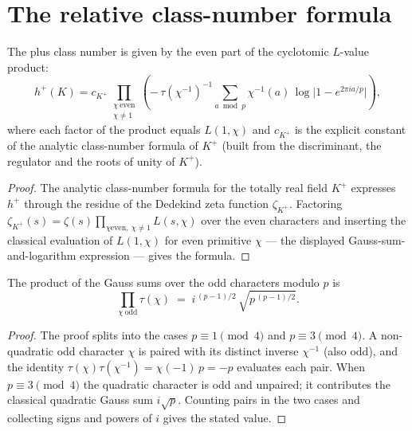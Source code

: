 \section{The relative class-number formula}

\begin{theorem}\label{thm:hplus-even-lvalues}
  \leanok
The plus class number is given by the even part of the cyclotomic
$L$-value product:
\[
  h^+(K)=
  c_{K^+}
  \prod_{\substack{\chi\ \mathrm{even}\\ \chi\ne1}}
  \left(
    -\,\tau(\chi^{-1})^{-1}
    \sum_{a \bmod p} \chi^{-1}(a)\,
      \log\bigl|1-e^{2\pi i a/p}\bigr|
  \right),
\]
where each factor of the product equals $L(1,\chi)$ and $c_{K^+}$ is the
explicit constant of the analytic class-number formula of $K^+$ (built
from the discriminant, the regulator and the roots of unity of $K^+$).
\end{theorem}
\begin{proof}\leanok
The analytic class-number formula for the totally real field $K^+$
expresses $h^+$ through the residue of the Dedekind zeta function
$\zeta_{K^+}$.  Factoring $\zeta_{K^+}(s) = \zeta(s)\prod_{\chi \text{
even},\ \chi\ne1} L(s,\chi)$ over the even characters and inserting the
classical evaluation of $L(1,\chi)$ for even primitive $\chi$ --- the
displayed Gauss-sum-and-logarithm expression --- gives the formula.
\end{proof}

\begin{theorem}\label{thm:raw-gauss-product}
  \leanok
The product of the Gauss sums over the odd characters modulo $p$ is
\[
  \prod_{\chi\ \mathrm{odd}} \tau(\chi)
  \;=\;
  i^{\,(p-1)/2}\,\sqrt{p^{\,(p-1)/2}} .
\]
\end{theorem}
\begin{proof}\leanok
The proof splits into the cases $p\equiv1\pmod4$ and $p\equiv3\pmod4$.  A
non-quadratic odd character $\chi$ is paired with its distinct inverse
$\chi^{-1}$ (also odd), and the identity
$\tau(\chi)\tau(\chi^{-1}) = \chi(-1)\,p = -p$ evaluates each pair.  When
$p \equiv 3 \pmod 4$ the quadratic character is odd and unpaired; it
contributes the classical quadratic Gauss sum $i\sqrt p$.  Counting pairs
in the two cases and collecting signs and powers of $i$ gives the stated
value.
\end{proof}

